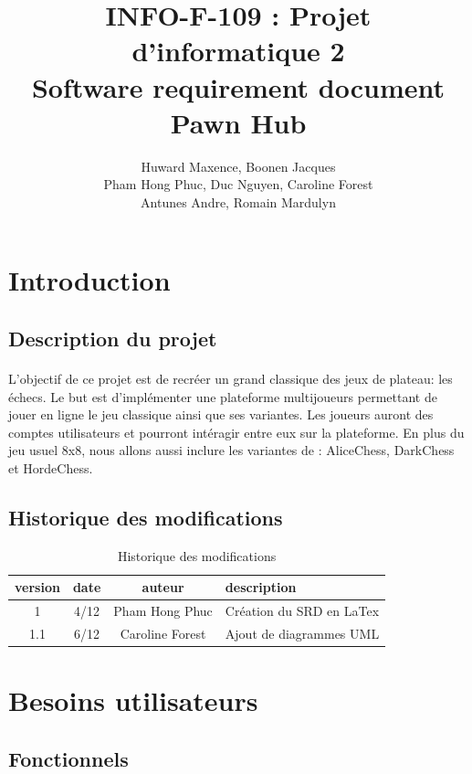 \documentclass[10pt, a4paper]{article}
\title{INFO-F-109 : Projet d'informatique 2 \\
       \textbf{Software requirement document\\
	   Pawn Hub}}
\author{Huward Maxence, Boonen Jacques\\
		Pham Hong Phuc, Duc Nguyen, Caroline Forest\\
		Antunes Andre, Romain Mardulyn}
\date{}
\begin{document}
	\maketitle
	\tableofcontents %
	\newpage
	\section{Introduction}
		\subsection{Description du projet}
			\paragraph{}L'objectif de ce projet est de recréer un grand classique des jeux de plateau: les échecs. Le but est d'implémenter une plateforme multijoueurs permettant de jouer en ligne le jeu classique ainsi que ses variantes.
Les joueurs auront des comptes utilisateurs et pourront intéragir entre eux sur la plateforme.
En plus du jeu usuel 8x8, nous allons aussi inclure les variantes de : AliceChess, DarkChess et HordeChess.

		\subsection{Historique des modifications}
		
		\begin{table}[h!]
			\centering
			\begin{tabular}{|c|c|c|p{50mm}|}
				\hline
				 \textbf{version} & \textbf{date} & \textbf{auteur}  & \textbf{description} \\ \hline
				 1 & 4/12 & Pham Hong Phuc & Création du SRD en LaTex\\ \hline
				 1.1 & 6/12 & Caroline Forest & Ajout de diagrammes UML\\ \hline

\end{tabular}
			\caption*{Historique des modifications}
			\end{table}


	\section{Besoins utilisateurs}
		\subsection{Fonctionnels}
		
\end{document}

